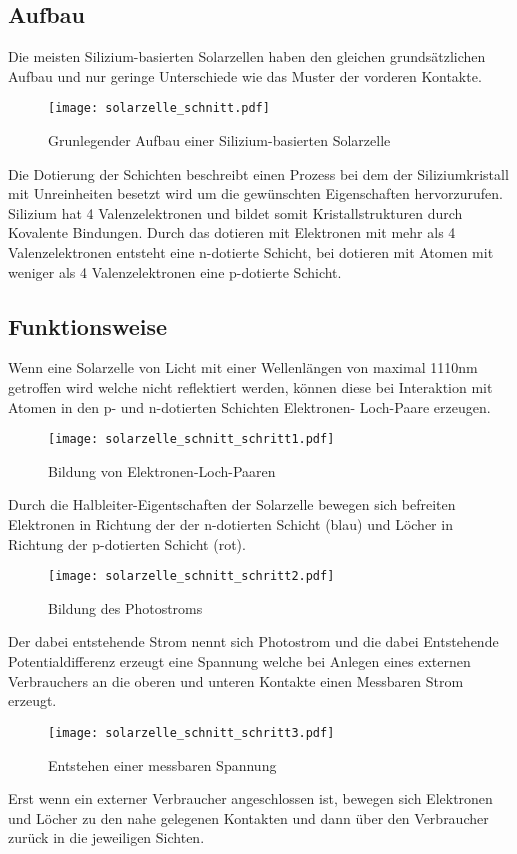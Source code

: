 \subsection{Aufbau}
    Die meisten Silizium-basierten Solarzellen haben den gleichen
    grundsätzlichen Aufbau und nur geringe Unterschiede wie das Muster
    der vorderen Kontakte.
    \begin{figure}[H]
        \centering
        \texttt{[image: solarzelle\_schnitt.pdf]}
        \caption{Grunlegender Aufbau einer Silizium-basierten Solarzelle}
    \end{figure}
    Die Dotierung der Schichten beschreibt einen Prozess bei dem der
    Siliziumkristall mit Unreinheiten besetzt wird um die gewünschten
    Eigenschaften hervorzurufen. Silizium hat 4 Valenzelektronen
    und bildet somit Kristallstrukturen durch Kovalente Bindungen. Durch
    das dotieren mit Elektronen mit mehr als 4 Valenzelektronen entsteht
    eine n-dotierte Schicht, bei dotieren mit Atomen mit weniger als 4
    Valenzelektronen eine p-dotierte Schicht.

\subsection{Funktionsweise}
    Wenn eine Solarzelle von Licht mit einer Wellenlängen von maximal 1110nm
    getroffen wird welche nicht reflektiert werden, können diese bei
    Interaktion mit Atomen in den p- und n-dotierten Schichten Elektronen-
    Loch-Paare erzeugen.
    \begin{figure}[H]
        \centering
        \texttt{[image: solarzelle\_schnitt\_schritt1.pdf]}
        \caption{Bildung von Elektronen-Loch-Paaren}
    \end{figure}
    Durch die Halbleiter-Eigentschaften der Solarzelle bewegen sich befreiten
    Elektronen in Richtung der der n-dotierten Schicht (blau) und Löcher in
    Richtung der p-dotierten Schicht (rot).
    \begin{figure}[H]
        \centering
        \texttt{[image: solarzelle\_schnitt\_schritt2.pdf]}
        \caption{Bildung des Photostroms}
    \end{figure}
    Der dabei entstehende Strom nennt sich Photostrom und die dabei Entstehende
    Potentialdifferenz erzeugt eine Spannung welche bei Anlegen eines externen
    Verbrauchers an die oberen und unteren Kontakte einen Messbaren Strom
    erzeugt.
    \begin{figure}[H]
        \centering
        \texttt{[image: solarzelle\_schnitt\_schritt3.pdf]}
        \caption{Entstehen einer messbaren Spannung}
    \end{figure}
    Erst wenn ein externer Verbraucher angeschlossen ist, bewegen sich
    Elektronen und Löcher zu den nahe gelegenen Kontakten und dann über den
    Verbraucher zurück in die jeweiligen Sichten.


